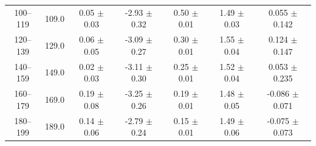 \begin{table}[htbp]
\begin{tabular}{c c c c c c c}
100--119 & 109.0 & 0.05 $\pm$ 0.03 & -2.93 $\pm$ 0.32 & 0.50 $\pm$ 0.01 & 1.49 $\pm$ 0.03 & 0.055 $\pm$ 0.142 \\
120--139 & 129.0 & 0.06 $\pm$ 0.05 & -3.09 $\pm$ 0.27 & 0.30 $\pm$ 0.01 & 1.55 $\pm$ 0.04 & 0.124 $\pm$ 0.147 \\
140--159 & 149.0 & 0.02 $\pm$ 0.03 & -3.11 $\pm$ 0.30 & 0.25 $\pm$ 0.01 & 1.52 $\pm$ 0.04 & 0.053 $\pm$ 0.235 \\
160--179 & 169.0 & 0.19 $\pm$ 0.08 & -3.25 $\pm$ 0.26 & 0.19 $\pm$ 0.01 & 1.48 $\pm$ 0.05 & -0.086 $\pm$ 0.071 \\
180--199 & 189.0 & 0.14 $\pm$ 0.06 & -2.79 $\pm$ 0.24 & 0.15 $\pm$ 0.01 & 1.49 $\pm$ 0.06 & -0.075 $\pm$ 0.073 \\
\hline\hline
\end{tabular}
\end{table}
